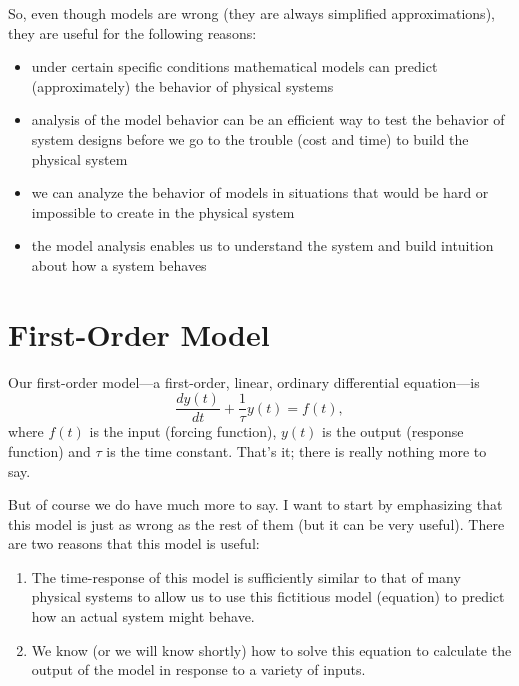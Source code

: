 So, even though models are wrong (they are always simplified approximations), they are useful for the following reasons:
\begin{itemize}
\item under certain specific conditions mathematical models can predict (approximately) the behavior of physical systems
\item analysis of the model behavior can be an efficient way to test the behavior of system designs before we go to the trouble (cost and time) to build the physical system
\item we can analyze the behavior of models in situations that would be hard or impossible to create in the physical system
\item the model analysis enables us to understand the system and build intuition about how a system behaves 
\end{itemize}

\section{First-Order Model}
Our \gls{first-order model}---a first-order, linear, ordinary differential equation---is 
\begin{equation}
\label{e:first}
\frac{dy(t)}{dt} + \frac{1}{\tau}y(t) = f(t),
\end{equation}
where $f(t)$ is the input (forcing function), $y(t)$ is the output (response function) and $\tau$ is the time constant.  That's it; there is really nothing more to say.  

But of course we do have much more to say.  I want to start by emphasizing that this model is just as wrong as the rest of them (but it can be very useful).  There are two reasons that this model is useful:
\begin{enumerate}
\item The time-response of this model is sufficiently similar to that of many physical systems to allow us to use this fictitious model (equation) to predict how an actual system might behave.
\item We know (or we will know shortly) how to solve this equation to calculate the output of the model in response to a variety of inputs.
\end{enumerate}

